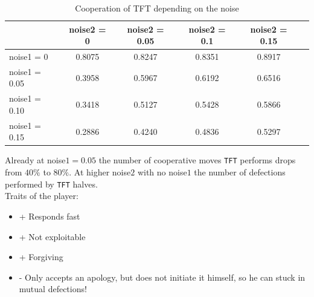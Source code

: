 \begin{table}[h]
 \begin{center}
\caption{Cooperation of TFT depending on the noise}\label{tab:tfttable2}  \vspace{3mm}
\begin{tabular}{|l|c|c|c|c|c|}
\hline
   	& noise2 = 0 & noise2 = 0.05& noise2 = 0.1& noise2 = 0.15 \\
  \hline
  noise1 = 0 	& 0.8075	 &0.8247 	&0.8351	&0.8917 \\
 \hline
  noise1 = 0.05	 & 0.3958	&    0.5967&    0.6192 &   0.6516 \\
 \hline
  noise1 = 0.10 	& 0.3418 &   0.5127 &   0.5428&   0.5866 \\
 \hline
  noise1 = 0.15 	& 0.2886  &  0.4240 &   0.4836  &  0.5297 \\
 \hline
\end{tabular}
 \end{center}
\end{table}

Already at noise$1=0.05$ the number of cooperative moves \verb'TFT' performs drops from $40\%$ to $80\%$. At higher noise$2$ with no noise$1$ the number of defections performed by \verb'TFT' halves.\\

Traits of the player:

\renewcommand{\labelitemi}{}

\begin{itemize}
	\item + Responds fast
	\item + Not exploitable
	\item + Forgiving
	\item - Only accepts an apology, but does not initiate it himself, so he can stuck in mutual defections!
\end{itemize}
\renewcommand{\labelitemi}{$\bullet$}

